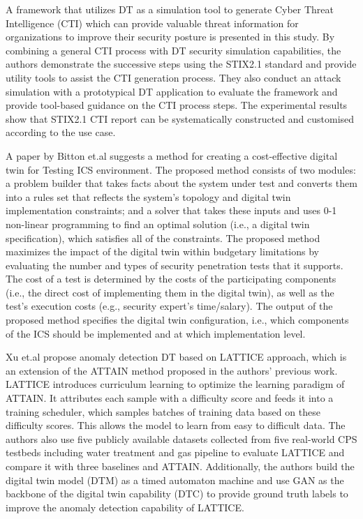 A framework that utilizes DT as a simulation tool to generate Cyber Threat Intelligence (CTI) which can provide valuable threat information for organizations to improve their security posture is presented in this study\cite{dietzHarnessingDigitalTwin2022}. By combining a general CTI process with DT security simulation capabilities, the authors demonstrate the successive steps using the STIX2.1 standard and provide utility tools to assist the CTI generation process. They also conduct an attack simulation with a prototypical DT application to evaluate the framework and provide tool-based guidance on the CTI process steps. The experimental results show that STIX2.1 CTI report can be systematically constructed and customised according to the use case. 


A paper by Bitton et.al \cite{bittonDerivingCostEffectiveDigital2018a} suggests a method for creating a cost-effective digital twin for Testing ICS environment. The proposed method consists of two modules: a problem builder that takes facts about the system under test and converts them into a rules set that reflects the system's topology and digital twin implementation constraints; and a solver that takes these inputs and uses 0-1 non-linear programming to find an optimal solution (i.e., a digital twin specification), which satisfies all of the constraints. The proposed method maximizes the impact of the digital twin within budgetary limitations by evaluating the number and types of security penetration tests that it supports. The cost of a test is determined by the costs of the participating components (i.e., the direct cost of implementing them in the digital twin), as well as the test's execution costs (e.g., security expert's time/salary). The output of the proposed method specifies the digital twin configuration, i.e., which components of the ICS should be implemented and at which implementation level.

Xu et.al \cite{xuDigitalTwinbasedAnomaly2023a} propose anomaly detection DT based on LATTICE approach, which is an extension of the ATTAIN method proposed in the authors' previous work. LATTICE introduces curriculum learning to optimize the learning paradigm of ATTAIN. It attributes each sample with a difficulty score and feeds it into a training scheduler, which samples batches of training data based on these difficulty scores. This allows the model to learn from easy to difficult data. The authors also use five publicly available datasets collected from five real-world CPS testbeds including water treatment and gas pipeline to evaluate LATTICE and compare it with three baselines and ATTAIN. Additionally, the authors build the digital twin model (DTM) as a timed automaton machine and use GAN as the backbone of the digital twin capability (DTC) to provide ground truth labels to improve the anomaly detection capability of LATTICE.


